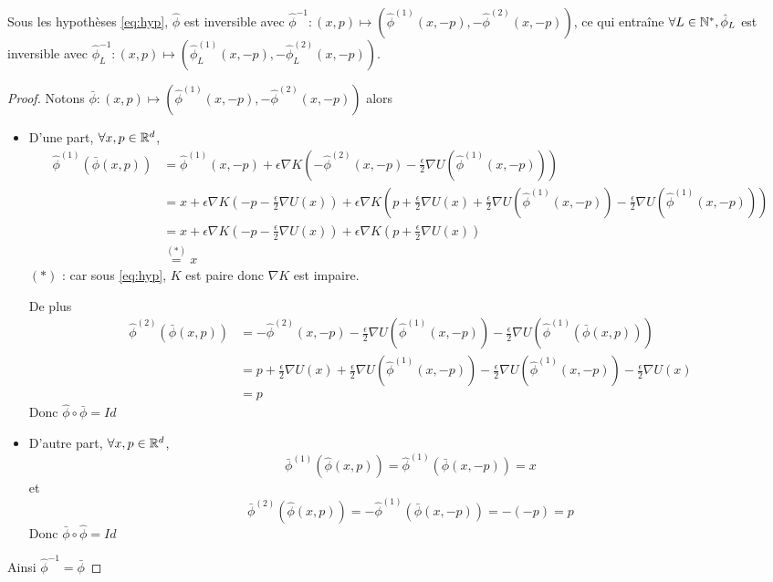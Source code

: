 \documentclass[10pt,a4paper]{article}
\begin{document}
\begin{Prop}[réversibilité]\label{prop:rev-leapfrog}
  Sous les hypothèses \eqref{eq:hyp}, $\hat{\phi}$ est inversible avec $\hat{\phi}^{-1} : (x,p) \mapsto (\hat{\phi}^{(1)}(x,-p), -\hat{\phi}^{(2)}(x,-p))$, ce qui entraîne $\forall L \in \mathbb{N}^*, \hat{\phi}_L$ est inversible avec $\hat{\phi}_L^{-1} : (x,p) \mapsto (\hat{\phi}_L^{(1)}(x,-p), -\hat{\phi}_L^{(2)}(x,-p))$. 
\end{Prop}
\begin{proof}
  Notons $\bar{\phi} : (x,p) \mapsto (\hat{\phi}^{(1)}(x,-p), -\hat{\phi}^{(2)}(x,-p))$ alors
  \begin{itemize}
  \item D'une part,  $\forall x,p \in \mathbb{R}^d$, 
    \begin{align*}
      \hat{\phi}^{(1)} (\bar{\phi}(x,p))
      &= \hat{\phi}^{(1)}(x,-p) + \epsilon \nabla K \left( -\hat{\phi}^{(2)}(x,-p) - \frac{\epsilon}{2} \nabla U (\hat{\phi}^{(1)}(x,-p)) \right) \\
      &= x + \epsilon \nabla K \left(-p - \frac{\epsilon}{2} \nabla U(x) \right) + \epsilon \nabla K \left(p + \frac{\epsilon}{2} \nabla U(x) + \frac{\epsilon}{2} \nabla U(\hat{\phi}^{(1)}(x,-p)) - \frac{\epsilon}{2} \nabla U (\hat{\phi}^{(1)}(x,-p)) \right) \\
      &= x + \epsilon \nabla K \left(-p - \frac{\epsilon}{2} \nabla U(x) \right) + \epsilon \nabla K \left(p + \frac{\epsilon}{2} \nabla U(x)\right) \\
      &\overset{(*)}{=} x 
    \end{align*}
    $(*)$ : car sous \eqref{eq:hyp}, $K$ est paire donc $\nabla K$ est impaire. 

    De plus
    \begin{align*}
      \hat{\phi}^{(2)}(\bar{\phi}(x,p))
      &= -\hat{\phi}^{(2)}(x,-p) - \frac{\epsilon}{2} \nabla U(\hat{\phi}^{(1)}(x,-p)) - \frac{\epsilon}{2} \nabla U(\hat{\phi}^{(1)}(\bar{\phi}(x,p))) \\
      &= p + \frac{\epsilon}{2} \nabla U(x) + \frac{\epsilon}{2} \nabla U(\hat{\phi}^{(1)}(x,-p)) - \frac{\epsilon}{2} \nabla U( \hat{\phi}^{(1)}(x,-p)) - \frac{\epsilon}{2} \nabla U(x) \\
      &= p
    \end{align*}
    Donc $\hat{\phi} \circ \bar{\phi} = Id$
\item D'autre part, $\forall x,p \in \mathbb{R}^d$, 
  $$
  \bar{\phi}^{(1)} (\hat{\phi}(x,p)) = \hat{\phi}^{(1)} (\bar{\phi}(x,-p)) = x 
  $$
  et
  $$
  \bar{\phi}^{(2)} (\hat{\phi}(x,p)) = - \hat{\phi}^{(1)} (\bar{\phi}(x,-p)) = -(-p) = p
  $$
    Donc $\bar{\phi} \circ \hat{\phi} = Id$
  \end{itemize}
  Ainsi $\hat{\phi}^{-1} = \bar{\phi}$
\end{proof}
\end{document}
